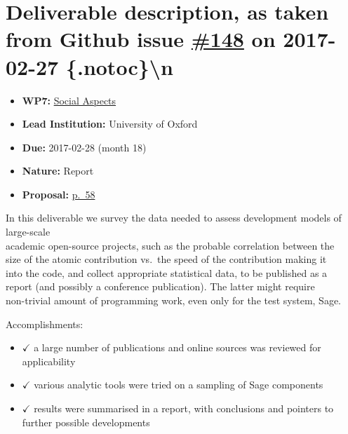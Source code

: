 \section*{\texorpdfstring{Deliverable description, as taken from Github
issue
\href{https://github.com/OpenDreamKit/OpenDreamKit/issues/148}{\#148} on
2017-02-27
\{.notoc\}\textbackslash{}n}{Deliverable description, as taken from Github issue \#148 on 2017-02-27 \{.notoc\}\textbackslash{}n}}\label{deliverable-description-as-taken-from-github-issue-148-on-2017-02-27-.notocn}

\begin{itemize}
\tightlist
\item
  \textbf{WP7:}
  \href{https://github.com/OpenDreamKit/OpenDreamKit/tree/master/WP7}{Social
  Aspects}
\item
  \textbf{Lead Institution:} University of Oxford
\item
  \textbf{Due:} 2017-02-28 (month 18)
\item
  \textbf{Nature:} Report
\item
  \textbf{Proposal:}
  \href{https://github.com/OpenDreamKit/OpenDreamKit/raw/master/Proposal/proposal-www.pdf}{p.~58}
\end{itemize}

In this deliverable we survey the data needed to assess development
models of large-scale\\
academic open-source projects, such as the probable correlation between
the\\
size of the atomic contribution vs.~the speed of the contribution making
it\\
into the code, and collect appropriate statistical data, to be published
as a\\
report (and possibly a conference publication). The latter might
require\\
non-trivial amount of programming work, even only for the test system,
Sage.

Accomplishments:

\begin{itemize}
\tightlist
\item
  \(\checkmark\) a large number of publications and online sources was
  reviewed for applicability
\item
  \(\checkmark\) various analytic tools were tried on a sampling of Sage
  components
\item
  \(\checkmark\) results were summarised in a report, with conclusions
  and pointers to further possible developments
\end{itemize}
